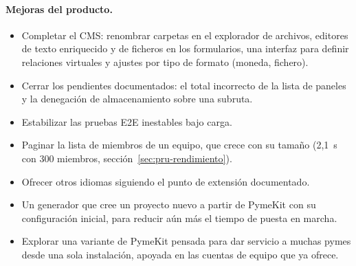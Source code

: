 \paragraph{Mejoras del producto.}
\begin{itemize}
  \item Completar el CMS: renombrar carpetas en el explorador de archivos,
        editores de texto enriquecido y de ficheros en los formularios, una
        interfaz para definir relaciones virtuales y ajustes por tipo de
        formato (moneda, fichero).
  \item Cerrar los pendientes documentados: el total incorrecto de
        la lista de paneles y la denegación de almacenamiento sobre una
        subruta.
  \item Estabilizar las pruebas E2E inestables bajo carga.
  \item Paginar la lista de miembros de un equipo, que crece con su tamaño
        (2,1~s con 300 miembros, sección~\ref{sec:pru-rendimiento}).
  \item Ofrecer otros idiomas siguiendo el punto de extensión documentado.
  \item Un generador que cree un proyecto nuevo a partir de PymeKit con su
        configuración inicial, para reducir aún más el tiempo de puesta en
        marcha.
  \item Explorar una variante de PymeKit pensada para dar servicio a muchas
        pymes desde una sola instalación, apoyada en las cuentas de equipo
        que ya ofrece.
\end{itemize}
